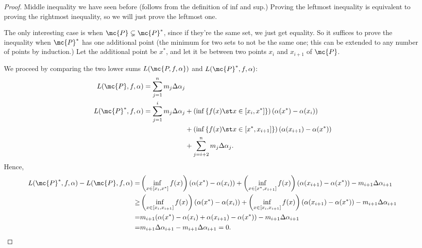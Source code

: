 \begin{proof}
	Middle inequality we have seen before (follows from the definition of inf and sup.) Proving the leftmost inequality is equivalent to proving the rightmost inequality, so we will just prove the leftmost one.
	
	\medskip
	
	The only interesting case is when \(\mc{P}\subsetneq \mc{P}^*\), since if they're the same set, we just get equality. So it suffices to prove the inequality when \(\mc{P}^*\) has one additional point (the minimum for two sets to not be the same one; this can be extended to any number of points by induction.) Let the additional point be \(x^*\), and let it be between two points \(x_i\) and \(x_{i+1}\) of \(\mc{P}\).
	
	\medskip
	
	We proceed by comparing the two lower sums \(L(\mc{P,f,\alpha})\) and \(L(\mc{P}^*,f,\alpha)\): 
	\begin{align*}
		L(\mc{P},f,\alpha)=\sum_{j=1}^{n}m_j\Delta \alpha_j&\\
		L(\mc{P}^*,f,\alpha)=\sum_{j=1}^{i}m_j\Delta \alpha_j&+\left(\inf{\{f(x)\st x\in [x_{i},x^*]\}}\right)(\alpha(x^*)-\alpha(x_i))\\
		&+\left(\inf{\{f(x)\st x\in [x^*,x_{i+1}]\}}\right)(\alpha(x_{i+1})-\alpha(x^*))\\
		&+\sum_{j=i+2}^n m_j\Delta \alpha_j.
	\end{align*}
	Hence, 
	\begin{align*}
		L(\mc{P}^*,f,\alpha)-L(\mc{P},f,\alpha)=&\left(\inf_{x\in[x_i,x^*]}{f(x)}\right)\left(\alpha(x^*)-\alpha(x_i)\right)+\left(\inf_{x\in[x^*,x_{i+1}]}{f(x)}\right)\left(\alpha(x_{i+1})-\alpha(x^*)\right)-m_{i+1}\Delta\alpha_{i+1}\\
		\geq&\left(\inf_{x\in[x_i,x_{i+1}]}{f(x)}\right)\left(\alpha(x^*)-\alpha(x_i)\right)+\left(\inf_{x\in[x_i,x_{i+1}]}{f(x)}\right)\left(\alpha(x_{i+1})-\alpha(x^*)\right)-m_{i+1}\Delta\alpha_{i+1}\\
		=&m_{i+1}(\alpha(x^*)-\alpha(x_i)+\alpha(x_{i+1})-\alpha(x^*))-m_{i+1}\Delta \alpha_{i+1}\\
		=&m_{i+1}\Delta \alpha_{i+1}-m_{i+1}\Delta \alpha_{i+1}=0.
	\end{align*}
\end{proof}

